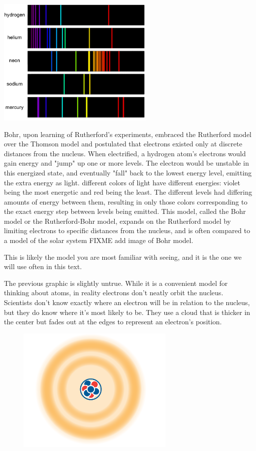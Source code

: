 \noindent\includegraphics[width=3in]{spectral_lines.png}


Bohr, upon learning of Rutherford's experiments,
embraced the Rutherford model over the Thomson model and postulated that electrons
existed only at discrete distances from the nucleus. When electrified, a hydrogen
atom's electrons would gain energy and "jump" up one or more levels. The electron
would be unstable in this energized state, and eventually "fall" back to the
lowest energy level, emitting the extra energy as light. different colors of
light have different energies: violet being the most energetic and red being the
least. The different levels had differing amounts of energy between them,
resulting in only those colors corresponding to the exact energy step between
levels being emitted. This model, called the Bohr model or the Rutherford-Bohr
model, expands on the Rutherford model by limiting electrons to specific
distances from the nucleus, and is often compared to a model of the solar system
FIXME add image of Bohr model.

This is likely the model you are most familiar with seeing, and it is the one we
will use often in this text.


The previous graphic is slightly untrue. While it is a convenient model for
thinking about atoms, in reality electrons don't neatly orbit the nucleus.
Scientists don't know exactly where an electron will be in relation to the
nucleus, but they do know where it's most likely to be. They use a cloud that is
thicker in the center but fades out at the edges to represent an electron's
position.


\begin{figure}
\noindent\includegraphics[trim={0 5cm 0 0}, width=3in]{atomCloud.png}
\end{figure}


